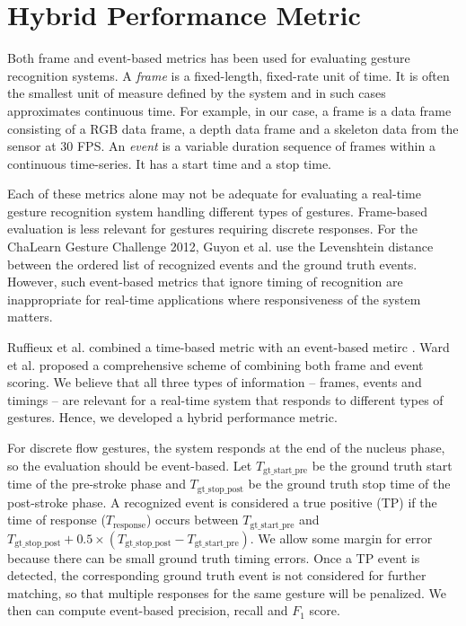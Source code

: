\documentclass[conference]{IEEEtran}
\begin{document}
\section{Hybrid Performance Metric}
Both frame \cite{song12} and event-based \cite{guyon13} metrics has been
used for evaluating gesture recognition systems. A \textit{frame} is a
fixed-length, fixed-rate unit of time. It is often the smallest unit of measure
defined by the system \cite{ward11} and in such cases approximates continuous
time.
For example, in our case, a frame is a data frame consisting of a RGB data frame, a depth data frame and a skeleton data from the
sensor at 30 FPS. An \textit{event} is a variable duration sequence of frames
within a continuous time-series.  It has a start time and a stop time.

Each of these metrics alone may not be adequate for evaluating a real-time
gesture recognition system handling different types of gestures. Frame-based
evaluation is less relevant for gestures requiring discrete responses. For the ChaLearn Gesture Challenge 2012, Guyon et al.
\cite{guyon13} use the Levenshtein distance between the ordered list of
recognized events and the ground truth events. However, such event-based metrics
that ignore timing of recognition are inappropriate for real-time
applications where responsiveness of the system matters.

Ruffieux et al. combined a time-based metric with an event-based metirc
\cite{Ruffieux2013}. Ward et al. \cite{ward11} proposed a comprehensive
scheme of combining both frame and event scoring.
We believe that all three types of information -- frames, events and
timings -- are relevant for a real-time system that responds to different types
of gestures. Hence, we developed a hybrid performance metric.

For discrete flow gestures, the system responds at the end of the nucleus phase,
so the evaluation should be event-based. Let $T_{{\text{gt\_start\_pre}}}$ be
the ground truth start time of the pre-stroke phase and
$T_{{\text{gt\_stop\_post}}}$ be the ground truth stop time of the post-stroke
phase.
A recognized event is considered a true positive (TP) if the time of response ($T_{\text{response}}$) 
occurs between $T_{{\text{gt\_start\_pre}}}$ and $T_{{\text{gt\_stop\_post}}} +
0.5\times(T_{{\text{gt\_stop\_post}}} - T_{\text{gt\_start\_pre}})$. We allow
some margin for error because there can be small ground truth timing errors.
Once a TP event is detected, the corresponding ground truth event is not
considered for further matching, so that multiple responses for the same gesture
will be penalized. We then can compute event-based precision, recall and $F_1$
score.
\end{document}
